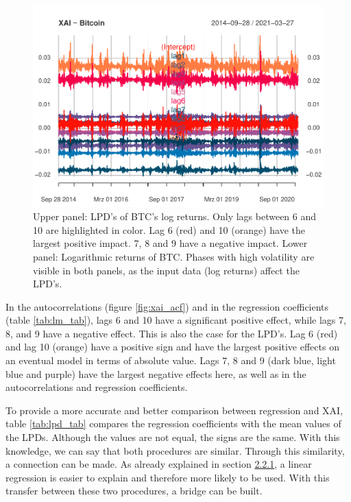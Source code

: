\documentclass[
]{article}
\begin{document}
\begin{figure}

{\centering \includegraphics[width=1\linewidth]{00_main_files/figure-latex/xai_plot1-1} 

}

\caption{Upper panel: LPD's of BTC's log returns. Only lags between 6 and 10 are highlighted in color. Lag 6 (red) and 10 (orange) have the largest positive impact. 7, 8 and 9 have a negative impact. Lower panel: Logarithmic returns of BTC. Phases with high volatility are visible in both panels, as the input data (log returns) affect the LPD's.}\label{fig:xai_plot1}
\end{figure}

In the autocorrelations (figure \ref{fig:xai_acf}) and in the regression
coefficients (table \ref{tab:lm_tab}), lags 6 and 10 have a significant
positive effect, while lags 7, 8, and 9 have a negative effect. This is
also the case for the LPD's. Lag 6 (red) and lag 10 (orange) have a
positive sign and have the largest positive effects on an eventual model
in terms of absolute value. Lags 7, 8 and 9 (dark blue, light blue and
purple) have the largest negative effects here, as well as in the
autocorrelations and regression coefficients.

\newpage

To provide a more accurate and better comparison between regression and
XAI, table \ref{tab:lpd_tab} compares the regression coefficients with
the mean values of the LPDs. Although the values are not equal, the
signs are the same. With this knowledge, we can say that both procedures
are similar. Through this similarity, a connection can be made. As
already explained in section \protect\hyperlink{classic}{2.2.1}, a
linear regression is easier to explain and therefore more likely to be
used. With this transfer between these two procedures, a bridge can be
built.
\end{document}
